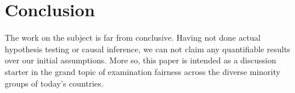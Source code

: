 \section{Conclusion}

The work on the subject is far from conclusive. Having not done actual hypothesis testing or causal inference, we can not claim any quantifiable results over our initial assumptions. More so, this paper is intended as a discussion starter in the grand topic of examination fairness across the diverse minority groups of today's countries.  





